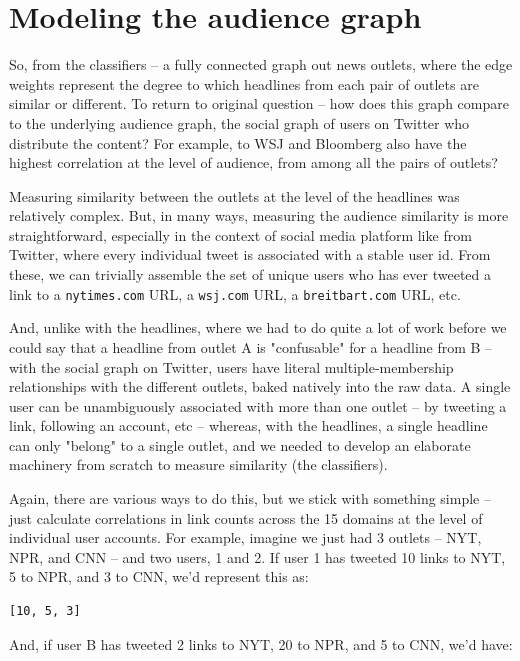 \documentclass{scrartcl}
\begin{document}
\section{Modeling the audience graph}

So, from the classifiers -- a fully connected graph out news outlets, where the edge weights represent the degree to which headlines from each pair of outlets are similar or different. To return to original question -- how does this graph compare to the underlying audience graph, the social graph of users on Twitter who distribute the content? For example, to WSJ and Bloomberg also have the highest correlation at the level of audience, from among all the pairs of outlets?

Measuring similarity between the outlets at the level of the headlines was relatively complex. But, in many ways, measuring the audience similarity is more straightforward, especially in the context of social media platform like from Twitter, where every individual tweet is associated with a stable user id. From these, we can trivially assemble the set of unique users who has ever tweeted a link to a \texttt{nytimes.com} URL, a \texttt{wsj.com} URL, a \texttt{breitbart.com} URL, etc.

And, unlike with the headlines, where we had to do quite a lot of work before we could say that a headline from outlet A is "confusable" for a headline from B -- with the social graph on Twitter, users have literal multiple-membership relationships with the different outlets, baked natively into the raw data. A single user can be unambiguously associated with more than one outlet -- by tweeting a link, following an account, etc -- whereas, with the headlines, a single headline can only "belong" to a single outlet, and we needed to develop an elaborate machinery from scratch to measure similarity (the classifiers).

Again, there are various ways to do this, but we stick with something simple -- just calculate correlations in link counts across the 15 domains at the level of individual user accounts. For example, imagine we just had 3 outlets -- NYT, NPR, and CNN -- and two users, 1 and 2. If user 1 has tweeted 10 links to NYT, 5 to NPR, and 3 to CNN, we'd represent this as:

\begin{lstlisting}
[10, 5, 3]
\end{lstlisting}

And, if user B has tweeted 2 links to NYT, 20 to NPR, and 5 to CNN, we'd have:
\end{document}
